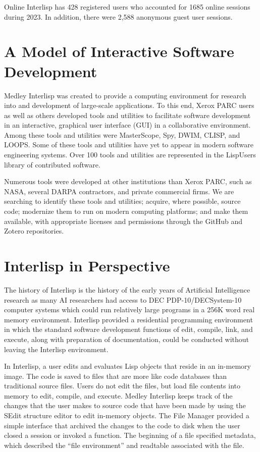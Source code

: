 \documentclass[sigconf]{acmart}
\begin{document}
Online Interlisp has 428 registered users who accounted for 1685 online sessions during 2023. In addition, there were 2,588 anonymous guest user sessions.

\section{A Model of Interactive Software Development}

Medley Interlisp was created to provide a computing environment for research into and development of large-scale applications. To this end, Xerox PARC users as well as others developed tools and utilities to facilitate software development in an interactive, graphical user interface (GUI) in a collaborative environment.\cite{Kaisler2021} Among these tools and utilities were MasterScope, Spy, DWIM, CLISP, and LOOPS. Some of these tools and utilities have yet to appear in modern software engineering systems. Over 100 tools and utilities are represented in the LispUsers library of contributed software.

Numerous tools were developed at other institutions than Xerox PARC, such as NASA, several DARPA contractors, and private commercial firms. We are searching to identify these tools and utilities; acquire, where possible, source code; modernize them to run on modern computing platforms; and make them available, with appropriate licenses and permissions through the GitHub and Zotero repositories.

\section{Interlisp in Perspective}

The history of Interlisp is the history of the early years of Artificial Intelligence research as many AI researchers had access to DEC PDP-10/DECSystem-10 computer systems which could run relatively large programs in a 256K word real memory environment\cite{Bobrow74}. Interlisp provided a residential programming environment in which the standard software development functions of edit, compile, link, and execute, along with preparation of documentation, could be conducted without leaving the Interlisp environment\cite{Teitelman73}.

In Interlisp, a user edits and evaluates Lisp objects that reside in an in-memory image. The code is saved to files that are more like code databases than traditional source files. Users do not edit the files, but load file contents into memory to edit, compile, and execute. Medley Interlisp keeps track of the changes that the user makes to source code that have been made by using the SEdit structure editor to edit in-memory objects. The File Manager provided a simple interface that archived the changes to the code to disk when the user closed a session or invoked a function. The beginning of a file specified metadata, which described the ``file environment'' and readtable associated with the file.
\end{document}

